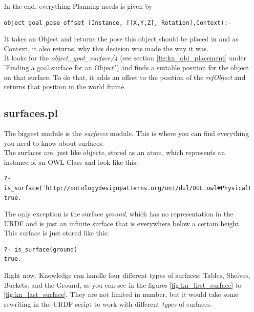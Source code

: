 \documentclass[main.tex]{subfiles}
\begin{document}
In the end, everything Planning needs is given by
\begin{lstlisting}
object_goal_pose_offset_(Instance, [[X,Y,Z], Rotation],Context):-
\end{lstlisting}
It takes an Object and returns the pose this object should be placed in and as Context, it also returns, why this decision was made the way it was.\\
It looks for the \textit{object\_goal\_surface/4} (see section \ref{fig:kn_obj_placement} under 'Finding a goal surface for an Object') and finds a suitable position for the object on that surface. To do that, it adds an offset to the position of the \textit{refObject} and returns that position in the world frame.

\subsection{surfaces.pl}

The biggest module is the \textit{surfaces} module. This is where you can find everything you need to know about surfaces.\\
The surfaces are, just like objects, stored as an atom, which represents an instance of an OWL-Class and look like this:
\begin{lstlisting}
?- is_surface('http://ontologydesignpatterns.org/ont/dul/DUL.owl#PhysicalObject_UHOJSVEC')
true.
\end{lstlisting}
The only exception is the surface \textit{ground}, which has no representation in the URDF and is just an infinite surface that is everywhere below a certain height. This surface is just stored like this:
\begin{lstlisting}
?- is_surface(ground)
true.
\end{lstlisting}

Right now, Knowledge can handle four different types of surfaces: Tables, Shelves, Buckets, and the Ground, as you can see in the figures \ref{fig:kn_first_surface} to \ref{fig:kn_last_surface}. They are not limited in number, but it would take some rewriting in the URDF script to work with different \textit{types} of surfaces.
\end{document}
